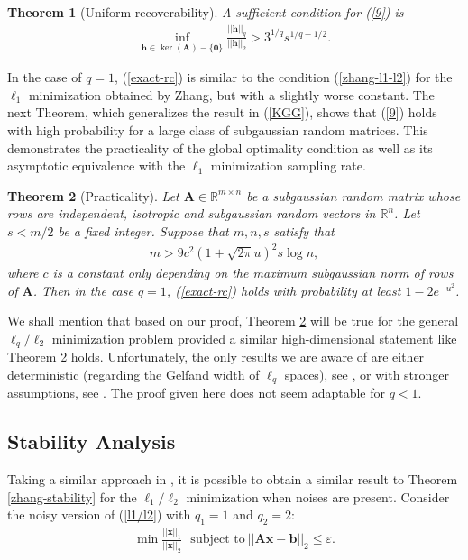 \documentclass[11pt]{article}
\numberwithin{equation}{section}
\theoremstyle{plain}
\newtheorem{Th}{Theorem}[section]
\theoremstyle{definition}
\def\R{{\mathbb R}}
\def\R{{\mathbb R}}
\def\A{{\mathbf A}}
\def\x{{\mathbf x}}
\def\b{{\mathbf b}}
\def\h{{\mathbf{h}}}
\def\e{{\varepsilon}}
\begin{document}
\begin{Th}[Uniform recoverability]\label{T5}
A sufficient condition for (\ref{9}) is
\begin{align}
\inf_{\h\in\ker(\A)-\{\mathbf{0}\}}\frac{||\h||_q}{||\h||_2}>3^{1/q}s^{1/q-1/2}.\label{exact-rc}
\end{align}
\end{Th} 

In the case of $q=1$, (\ref{exact-rc}) is similar to the condition (\ref{zhang-l1-l2}) for the $\ell_1$ minimization obtained by Zhang, but with a slightly worse constant. The next Theorem, which generalizes the result in (\ref{KGG}), shows that (\ref{9}) holds with high probability for a large class of subgaussian random matrices. This demonstrates the practicality of the global optimality condition as well as its asymptotic equivalence with the $\ell_1$ minimization sampling rate. 


\begin{Th}[Practicality]\label{T4}
Let $\A\in\R^{m\times n}$ be a subgaussian random matrix whose rows are independent, isotropic and subgaussian random vectors in $\R^n$. Let $s<m/2$ be a fixed integer. Suppose that $m, n, s$ satisfy that 
\begin{align*}
m>9c^2(1+\sqrt{2\pi}u)^2s\log n,
\end{align*}
where $c$ is a constant only depending on the maximum subgaussian norm of rows of $\A$. Then in the case $q=1$, (\ref{exact-rc}) holds with probability at least $1-2e^{-u^2}$. 
\end{Th}

We shall mention that based on our proof, Theorem \ref{T4} will be true for the general $\ell_q/\ell_2$ minimization problem provided a similar high-dimensional statement like Theorem \ref{T4} holds. Unfortunately, the only results we are aware of are either deterministic (regarding the Gelfand width of $\ell_q$ spaces), see \cite{foucart2010gelfand}, or with stronger assumptions, see \cite{donoho2006compressed}. The proof given here does not seem adaptable for $q<1$.   




\subsection{Stability Analysis}

Taking a similar approach in \cite{zhang2013theory}, it is possible to obtain a similar result to Theorem \ref{zhang-stability} for the $\ell_1/\ell_2$ minimization when noises are present. Consider the noisy version of (\ref{l1/l2}) with $q_1=1$ and $q_2=2$: 
\begin{align}
\min\frac{||\x||_1}{||\x||_2} \ \ \ \text{subject to}\ ||\A\x-\b||_2\leq\e.\label{777}
\end{align}
\end{document}

